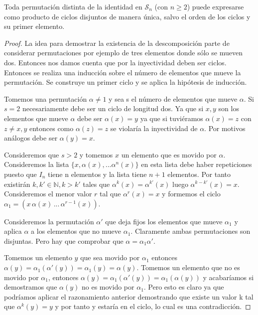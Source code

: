 \begin{nth}
Toda permutación distinta de la identidad en $\mathcal S_n$ (con $n \ge 2$) puede expresarse como producto de ciclos disjuntos de manera única, salvo el orden de los ciclos y su primer elemento.
\end{nth}

\begin{proof}
La idea para demostrar la existencia de la descomposición parte de considerar permutaciones por ejemplo de tres elementos donde sólo se mueven dos. Entonces nos damos cuenta que por la inyectividad deben ser ciclos. Entonces se realiza una inducción sobre el número de elementos que mueve la permutación. Se construye un primer ciclo y se aplica la hipótesis de inducción.

Tomemos una permutación $\alpha \neq 1$ y sea s el número de elementos que mueve $\alpha$. Si $s = 2$ necesariamente debe ser un ciclo de longitud dos. Ya que si $x,y$ son los elementos que mueve $\alpha$ debe ser $\alpha(x) = y$ ya que si tuviéramos $\alpha(x) = z$ con $z \neq x,y$ entonces como $\alpha(z) = z$ se violaría la inyectividad de $\alpha$. Por motivos análogos debe ser $\alpha(y) = x$.

Consideremos que $s > 2$ y tomemos $x$ un elemento que es movido por $\alpha$. Consideremos la lista $\{x,\alpha(x),...\alpha^n(x)\}$ en esta lista debe haber repeticiones puesto que $I_n$ tiene n elementos y la lista tiene $n+1$ elementos. Por tanto existirán $k,k' \in \mathbb{N}, k > k'$ tales que $\alpha^{k}(x) = \alpha^{k'}(x)$ luego $\alpha^{k-k'}(x) = x$. Consideremos el menor valor $r$ tal que $\alpha^r(x) = x$ y formemos el ciclo $\alpha_1 = (x \, \alpha(x) \, ...  \, \alpha^{r-1}(x))$.

Consideremos la permutación $\alpha'$ que deja fijos los elementos que mueve $\alpha_1$ y aplica $\alpha$ a los elementos que no mueve $\alpha_1$. Claramente  ambas permutaciones son disjuntas. Pero hay que comprobar que $\alpha = \alpha_1 \alpha'$.

Tomemos un elemento $y$ que sea movido por $\alpha_1$ entonces $\alpha(y) = \alpha_1(\alpha'(y)) = \alpha_1(y) = \alpha(y)$. Tomemos un elemento que no es movido por $\alpha_1$, entonces $\alpha(y) = \alpha_1(\alpha'(y)) = \alpha_1(\alpha(y))$ y acabaríamos si demostramos que $\alpha(y)$ no es movido por $\alpha_1$. Pero esto es claro ya que podríamos aplicar el razonamiento anterior demostrando que existe un valor k tal que $\alpha^k(y) = y$ y por tanto y estaría en el ciclo, lo cual es una contradicción.


\end{proof}
